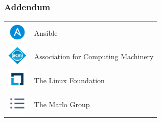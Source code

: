 \documentclass[pdf]{beamer}
\begin{document}
\begin{frame}
  \frametitle{Addendum}
  \begin{tabular}{ m{1cm} m{6cm} }
    \includegraphics[width=1.0cm]{ansible-logo.png} & Ansible \\
    \includegraphics[width=1.0cm]{acm-logo.png} & Association for Computing Machinery \\
    \includegraphics[width=1.0cm]{thelinuxfoundation-logo.png} & The Linux Foundation \\
    \includegraphics[width=1.0cm]{themarlogroup-logo.png} & The Marlo Group
  \end{tabular}
\end{frame}
\end{document}
